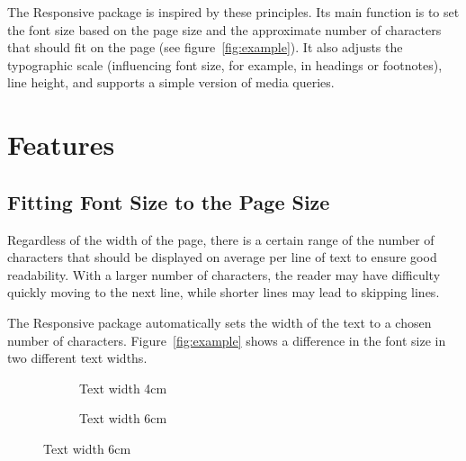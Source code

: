 \documentclass{ltxdoc}
\begin{document}
The Responsive package is inspired by these principles. Its main function
is to set the font size based on the page size and the approximate number of
characters that should fit on the page (see figure~\ref{fig:example}). It also adjusts the typographic scale
(influencing font size, for example, in headings or footnotes), line height,
and supports a simple version of media queries.


\section{Features}


\subsection{Fitting Font Size to the Page Size}

Regardless of the width of the page, there is a certain range of the number of
characters that should be displayed on average per line of text to ensure good
readability. With a larger number of characters, the reader may have difficulty
quickly moving to the next line, while shorter lines may lead to skipping
lines. 

The Responsive package automatically sets the width of the text to a chosen number of characters.
Figure~\ref{fig:example} shows a difference in the font size in two
different text widths.


\begin{figure}[htbp]
  \caption{Example of changing font size based on the width of the text block:}\label{fig:example}
\begin{subfigure}[t]{0.45\textwidth}
\fbox{%
\begin{minipage}{4cm}
\ResponsiveSetup{}
\setsizes{}

\lipsum[1]

\end{minipage}}
\caption{Text width 4cm}
\end{subfigure}
\begin{subfigure}[t]{0.45\textwidth}
\caption{Text width 6cm}
\end{subfigure}
\end{figure}
\end{document}
